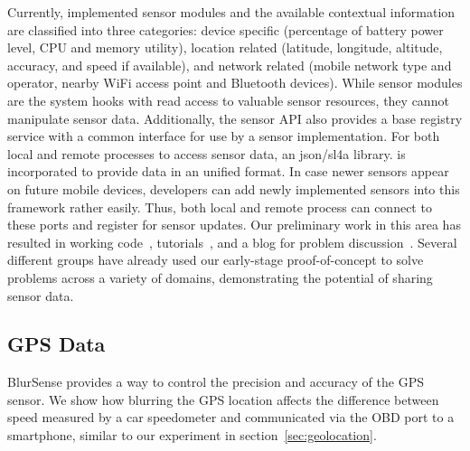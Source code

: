 Currently, implemented sensor modules and
the available contextual information are classified into three
categories: device specific (percentage of battery power level,
CPU and memory utility), location related (latitude, longitude,
altitude, accuracy, and speed if available), and network related
(mobile network type and operator, nearby WiFi access point
and Bluetooth devices). While sensor modules are the system
hooks with read access to valuable sensor resources, they
cannot manipulate sensor data. Additionally, the sensor API
also provides a base registry service with a common interface
for use by a sensor implementation. For both local and remote
processes to access sensor data, an json/sl4a library. 
is incorporated to provide data in an unified format. In case
newer sensors appear on future mobile devices, developers can
add newly implemented sensors into this framework rather
easily. 
Thus, both local and remote
process can connect to these ports and register for sensor
updates.
Our preliminary work in this area has resulted in working 
code~\cite{seattle-sensor-git}, tutorials~\cite{seattle-sensor-project}, and a 
blog for problem discussion~\cite{sensor}. Several different groups have
already used our early-stage proof-of-concept to solve problems across a variety
of domains, demonstrating the potential of sharing sensor data. 

\subsection{GPS Data}

BlurSense provides a way to control the precision and accuracy of the GPS
sensor.  We show how blurring the GPS location affects the difference between
speed measured by a car speedometer and communicated via the OBD port to
a smartphone, similar to our experiment in section~\ref{sec:geolocation}.

